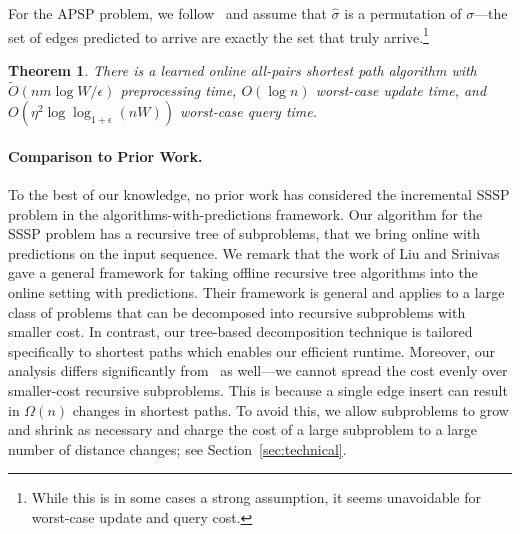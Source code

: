 \documentclass[11pt]{article}
\newtheorem{theorem}{Theorem}
\begin{document}
For the APSP problem, we follow~\cite{HenzingerSSY24,BrandFNP24} and assume that $\hat{\sigma}$ is a permutation of $\sigma$---the set of edges predicted to arrive are exactly the set that truly arrive.\footnote{While this is in some cases a strong assumption, it seems unavoidable for worst-case update and query cost.} 

\begin{theorem}\label{thm:online-apsp}
    There is a learned online all-pairs shortest path algorithm with $\tilde{O}(nm\log W / \epsilon)$ preprocessing time, $O(\log n)$ worst-case update time, and $O(\eta^2\log\log_{1 + \epsilon} (nW))$ worst-case query time.
\end{theorem}

\paragraph{Comparison to Prior Work.} 

To the best of our knowledge, no prior work has considered the incremental SSSP problem in the algorithms-with-predictions framework. Our algorithm for the SSSP problem has a recursive tree of subproblems, that we bring online with predictions on the input sequence.  We remark that the work of   Liu and Srinivas \cite{liu2023predicted} gave a general framework for taking offline recursive tree algorithms into the online setting with predictions. Their framework is general and applies to a large class of problems that can be decomposed into recursive subproblems with smaller cost.
In contrast, our tree-based decomposition technique is tailored specifically to shortest paths which enables our efficient runtime.  Moreover, our analysis differs significantly from~\cite{liu2023predicted} as well---we cannot spread the cost evenly over smaller-cost recursive subproblems.  This is because a single edge insert can result in $\Omega(n)$ changes in shortest paths.  To avoid this, we allow subproblems to grow and shrink as necessary and charge the cost of a large subproblem to a large number of distance changes; see Section~\ref{sec:technical}.
\end{document}
